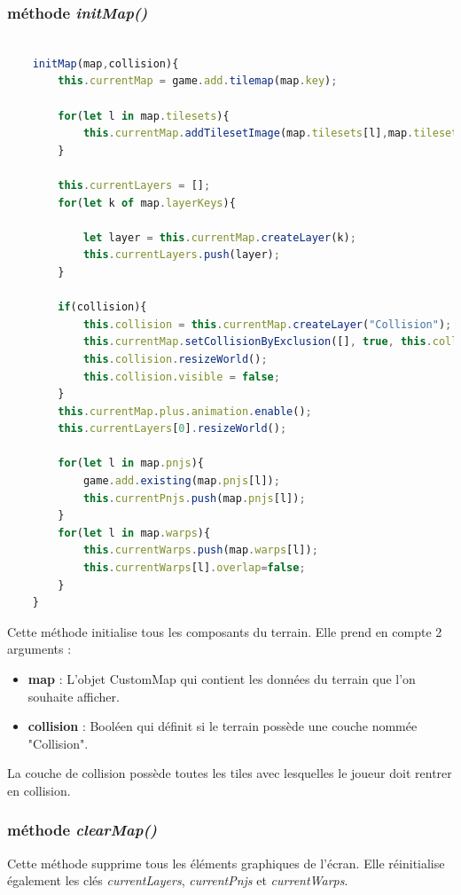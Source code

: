 \documentclass[11pt]{article}
\begin{document}
\subsubsection{méthode \textit{initMap()}}
\begin{lstlisting}[language=JavaScript]

    initMap(map,collision){ 
        this.currentMap = game.add.tilemap(map.key);

        for(let l in map.tilesets){
            this.currentMap.addTilesetImage(map.tilesets[l],map.tilesets[l]); 
        }

        this.currentLayers = [];
        for(let k of map.layerKeys){

            let layer = this.currentMap.createLayer(k);
            this.currentLayers.push(layer);
        }

        if(collision){
            this.collision = this.currentMap.createLayer("Collision");
            this.currentMap.setCollisionByExclusion([], true, this.collision);
            this.collision.resizeWorld();
            this.collision.visible = false;
        }
        this.currentMap.plus.animation.enable();
        this.currentLayers[0].resizeWorld();

        for(let l in map.pnjs){
            game.add.existing(map.pnjs[l]);
            this.currentPnjs.push(map.pnjs[l]);
        }
        for(let l in map.warps){
            this.currentWarps.push(map.warps[l]);
            this.currentWarps[l].overlap=false;
        }
    }
\end{lstlisting} 
Cette méthode initialise tous les composants du terrain. Elle prend en compte 2 arguments :
\begin{itemize}
\item \textbf{map} : L'objet CustomMap qui contient les données du terrain que l'on souhaite afficher. 
\item \textbf{collision} : Booléen qui définit si le terrain possède une couche nommée "Collision".
\end{itemize}
La couche de collision possède toutes les tiles avec lesquelles le joueur doit rentrer en collision. \\


\subsubsection{méthode \textit{clearMap()}}
Cette méthode supprime tous les éléments graphiques de l'écran. Elle réinitialise également les clés \textit{currentLayers}, \textit{currentPnjs} et \textit{currentWarps}.
\end{document}
